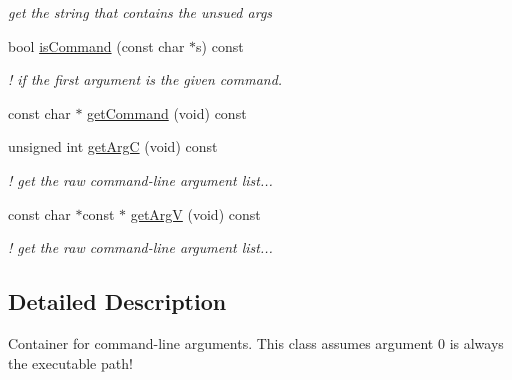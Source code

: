 \begin{DoxyCompactItemize}
\begin{DoxyCompactList}\small\item\em get the string that contains the unsued args \item\end{DoxyCompactList}\item 
\hypertarget{classFramework_1_1SampleCommandLine_ac57ee04719e974cbc1dcd939d05e8bae}{
bool \hyperlink{classFramework_1_1SampleCommandLine_ac57ee04719e974cbc1dcd939d05e8bae}{isCommand} (const char $\ast$s) const }
\label{classFramework_1_1SampleCommandLine_ac57ee04719e974cbc1dcd939d05e8bae}

\begin{DoxyCompactList}\small\item\em ! if the first argument is the given command. \item\end{DoxyCompactList}\item 
const char $\ast$ \hyperlink{classFramework_1_1SampleCommandLine_a13ab8af52edd8fa4c7e52c2fd90aa0d8}{getCommand} (void) const 
\item 
\hypertarget{classFramework_1_1SampleCommandLine_aa33e91b4aedc886fa1d8f617a1cc1223}{
unsigned int \hyperlink{classFramework_1_1SampleCommandLine_aa33e91b4aedc886fa1d8f617a1cc1223}{getArgC} (void) const }
\label{classFramework_1_1SampleCommandLine_aa33e91b4aedc886fa1d8f617a1cc1223}

\begin{DoxyCompactList}\small\item\em ! get the raw command-\/line argument list... \item\end{DoxyCompactList}\item 
\hypertarget{classFramework_1_1SampleCommandLine_a5955d2529cf83a9237f5e1a82d44560a}{
const char $\ast$const $\ast$ \hyperlink{classFramework_1_1SampleCommandLine_a5955d2529cf83a9237f5e1a82d44560a}{getArgV} (void) const }
\label{classFramework_1_1SampleCommandLine_a5955d2529cf83a9237f5e1a82d44560a}

\begin{DoxyCompactList}\small\item\em ! get the raw command-\/line argument list... \item\end{DoxyCompactList}\end{DoxyCompactItemize}


\subsection{Detailed Description}
Container for command-\/line arguments. This class assumes argument 0 is always the executable path! 

